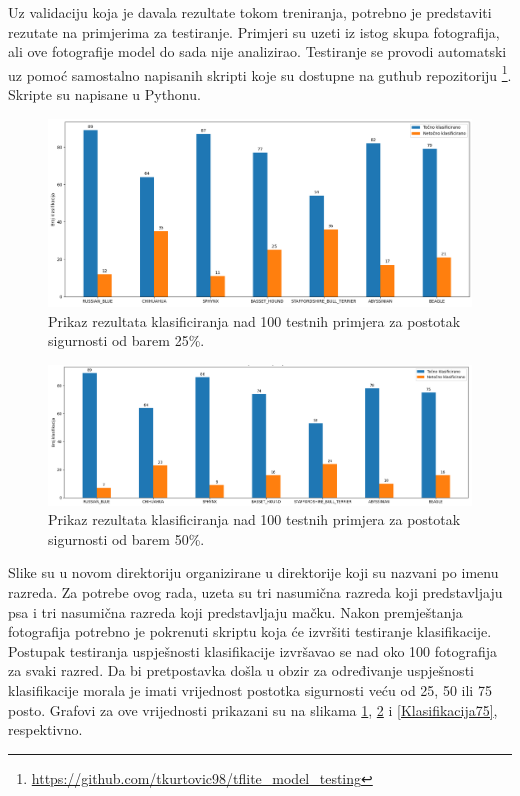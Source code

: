 Uz validaciju koja je davala rezultate tokom treniranja, potrebno je predstaviti rezutate na primjerima za testiranje. Primjeri su uzeti iz istog skupa fotografija, ali ove fotografije
model do sada nije analizirao. Testiranje se provodi automatski uz pomoć samostalno napisanih skripti koje su dostupne na guthub repozitoriju \footnote{\url{https://github.com/tkurtovic98/tflite_model_testing}}.
Skripte su napisane u Pythonu.

\begin{figure}[htb]
    \centering
    \includegraphics[width=14cm]{img/Klasifikacija_25.png}
    \caption{Prikaz rezultata klasificiranja nad 100 testnih primjera za postotak sigurnosti od barem 25\%. }
    \label{Klasifikacija25}
\end{figure}

\begin{figure}[htb]
    \centering
    \includegraphics[width=14cm]{img/Klasifikacija_test.png}
    \caption{Prikaz rezultata klasificiranja nad 100 testnih primjera za postotak sigurnosti od barem 50\%.}
    \label{Klasifikacija50}
\end{figure}


Slike su u novom direktoriju organizirane u direktorije koji su nazvani po imenu razreda. 
Za potrebe ovog rada, uzeta su tri nasumična razreda koji predstavljaju psa i tri nasumična razreda koji predstavljaju mačku. Nakon premještanja fotografija potrebno je pokrenuti skriptu koja će izvršiti testiranje
klasifikacije. Postupak testiranja uspješnosti klasifikacije izvršavao se nad oko 100 fotografija za svaki razred. Da bi pretpostavka došla u obzir za određivanje uspješnosti klasifikacije morala je imati 
vrijednost postotka sigurnosti veću od 25, 50 ili 75 posto. Grafovi za ove vrijednosti prikazani su na slikama \ref{Klasifikacija25}, \ref{Klasifikacija50} i \ref{Klasifikacija75}, respektivno.

